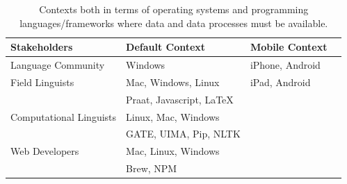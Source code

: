 \documentclass[11pt]{article}
\newcommand{\smalltodo}[2][]
    {\todo[caption={#2}, #1]
    {\tiny#2\normalsize}}
\begin{document}
\begin{table}[h]
\begin{center}
\scriptsize
\begin{tabular}{llll}
      \toprule
      Stakeholders & Default Context & Mobile Context\\\hline\hline
     
      Language Community & Windows &  iPhone, Android\\
      \midrule

	Field Linguists & Mac, Windows, Linux & iPad, Android\\
	  & Praat, Javascript, LaTeX \\
	  \midrule

	Computational Linguists & Linux, Mac, Windows\\
	 & GATE, UIMA, Pip, NLTK\\
	\midrule

	Web Developers & Mac, Linux, Windows\\
	 & Brew, NPM\\

      \bottomrule

\end{tabular}
\caption{Contexts both in terms of operating systems and programming languages/frameworks where data and  data processes must be available.}
\label{requirements-contexts}
 \end{center}
 \normalsize
\end{table}





%
\end{document}
